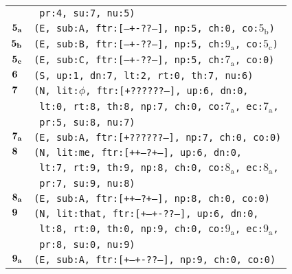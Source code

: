 \documentclass{article}
\begin{document}
\begin{minipage}{\textwidth}
{\begin{tabular}{|r|l|}
    & \texttt{\texttt{~pr:4,~su:7,~nu:5)}} \\
    ${\textbf{\textrm{5}}_{\textbf{\textrm{a}}}}$ & \texttt{\texttt{(E,~sub:A,~ftr:[---+-??--],~np:5,~ch:0,~co:${\textrm{5}_{\textrm{b}}}$)}} \\
    ${\textbf{\textrm{5}}_{\textbf{\textrm{b}}}}$ & \texttt{\texttt{(E,~sub:B,~ftr:[---+-??--],~np:5,~ch:${\textrm{9}_{\textrm{a}}}$,~co:${\textrm{5}_{\textrm{c}}}$)}} \\
    ${\textbf{\textrm{5}}_{\textbf{\textrm{c}}}}$ & \texttt{\texttt{(E,~sub:C,~ftr:[---+-??--],~np:5,~ch:${\textrm{7}_{\textrm{a}}}$,~co:0)}} \\
    ${\textbf{\textrm{6}}_{\phantom{z}}}$ & \texttt{\texttt{(S,~up:1,~dn:7,~lt:2,~rt:0,~th:7,~nu:6)}} \\
    ${\textbf{\textrm{7}}_{\phantom{z}}}$ & \texttt{\texttt{(N,~lit:$\phi$,~ftr:[+??????--],~up:6,~dn:0,}} \\
    & \texttt{\texttt{~lt:0,~rt:8,~th:8,~np:7,~ch:0,~co:${\textrm{7}_{\textrm{a}}}$,~ec:${\textrm{7}_{\textrm{a}}}$,}} \\
    & \texttt{\texttt{~pr:5,~su:8,~nu:7)}} \\
    ${\textbf{\textrm{7}}_{\textbf{\textrm{a}}}}$ & \texttt{\texttt{(E,~sub:A,~ftr:[+??????--],~np:7,~ch:0,~co:0)}} \\
    ${\textbf{\textrm{8}}_{\phantom{z}}}$ & \texttt{\texttt{(N,~lit:me,~ftr:[++---?+--],~up:6,~dn:0,}} \\
    & \texttt{\texttt{~lt:7,~rt:9,~th:9,~np:8,~ch:0,~co:${\textrm{8}_{\textrm{a}}}$,~ec:${\textrm{8}_{\textrm{a}}}$,}} \\
    & \texttt{\texttt{~pr:7,~su:9,~nu:8)}} \\
    ${\textbf{\textrm{8}}_{\textbf{\textrm{a}}}}$ & \texttt{\texttt{(E,~sub:A,~ftr:[++---?+--],~np:8,~ch:0,~co:0)}} \\
    ${\textbf{\textrm{9}}_{\phantom{z}}}$ & \texttt{\texttt{(N,~lit:that,~ftr:[+--+-??--],~up:6,~dn:0,}} \\
    & \texttt{\texttt{~lt:8,~rt:0,~th:0,~np:9,~ch:0,~co:${\textrm{9}_{\textrm{a}}}$,~ec:${\textrm{9}_{\textrm{a}}}$,}} \\
    & \texttt{\texttt{~pr:8,~su:0,~nu:9)}} \\
    ${\textbf{\textrm{9}}_{\textbf{\textrm{a}}}}$ & \texttt{\texttt{(E,~sub:A,~ftr:[+--+-??--],~np:9,~ch:0,~co:0)}} \\
    \hline
  \end{tabular}
  }
\end{minipage}
\bigbreak
\end{document}
